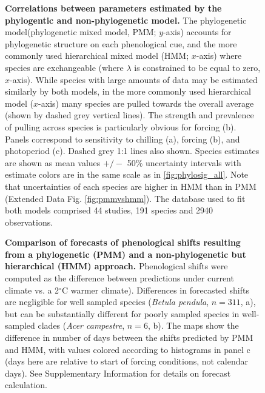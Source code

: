 \documentclass{article}
\begin{document}
\begin{figure} 
  \begin{center}
  \caption{\textbf{Correlations between parameters estimated by the phylogentic and non-phylogenetic model.} The phylogenetic model(phylogenetic mixed model, PMM; $y$-axis) accounts for phylogenetic structure on each phenological cue, and the more commonly used hierarchical mixed model (HMM; $x$-axis) where species are exchangeable (where $\lambda$ is constrained to be equal to zero, $x$-axis). While species with large amounts of data may be estimated similarly by both models, in the more commonly used hierarchical model ($x$-axis) many species are pulled towards the overall average (shown by dashed grey vertical lines). The strength and prevalence of pulling across species is particularly obvious for forcing (b). Panels correspond to sensitivity to chilling (a), forcing (b), and photoperiod (c). Dashed grey 1:1 lines also shown. Species estimates are shown as mean values $+/-$ 50\% uncertainty intervals with estimate colors are in the same scale as in \ref{fig:phylosig_all}. Note that uncertainties of each species are higher in HMM than in PMM (Extended Data Fig. \ref{fig:pmmvshmm}). The database used to fit both models comprised 44 studies, 191 species and 2940 observations.}
  \label{fig:correls_angio}
  \end{center}
\end{figure}




\begin{figure} 
  \begin{center}
  \caption{\textbf{Comparison of forecasts of phenological shifts resulting from a phylogenetic (PMM) and a non-phylogenetic but hierarchical (HMM) approach.} Phenological shifts were computed as the difference between predictions under current climate vs. a 2$^{\circ}$C warmer climate). Differences in forecasted shifts are negligible for well sampled species (\emph{Betula pendula}, $n = 311$, a), but can be substantially different for poorly sampled species in well-sampled clades (\emph{Acer campestre}, $n = 6$, b). The maps show the difference in number of days between the shifts predicted by PMM and HMM, with values colored according to histograms in panel c (days here are relative to start of forcing conditions, not calendar days). See Supplementary Information for details on forecast calculation.}
  \label{fig:forecast}
  \end{center}
\end{figure}
\end{document}
